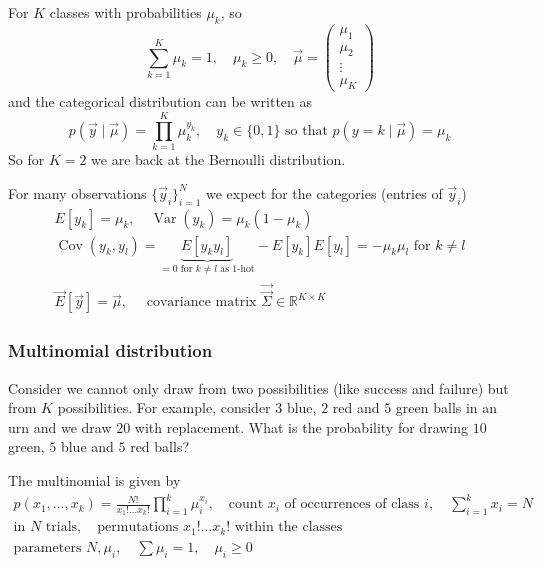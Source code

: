 For $K$ classes with probabilities $\mu_k$, so
\begin{equation}
    \sum_{k=1}^{K} \mu_k = 1, \quad \mu_k \geq 0, \quad \vec{\mu} = \left(\begin{array}{c}
        \mu_1 \\ \mu_2 \\ \vdots \\ \mu_K
    \end{array}\right)
\end{equation}
and the categorical distribution can be written as
\begin{equation}
    p(\vec{y} \mid \vec{\mu}) = \prod_{k=1}^{K} \mu_k^{y_k}, \quad y_k \in \{0,1\} \text{ so that } p(y = k \mid \vec{\mu}) = \mu_k
\end{equation}
So for $K = 2$ we are back at the Bernoulli distribution.

For many observations $\{\vec{y}_i\}_{i=1}^N$ we expect for the categories (entries of $\vec{y}_i$)
\begin{equation}
    \begin{gathered}
    E\left[y_k\right]=\mu_k, \quad \operatorname{Var}\left(y_k\right)=\mu_k\left(1-\mu_k\right) \\
    \operatorname{Cov}\left(y_k, y_l\right)=\underbrace{E\left[y_k y_l\right]}_{=0 \text{ for } k\neq l \text{ as 1-hot}}-E\left[y_k\right] E\left[y_l\right]=-\mu_k \mu_l \text { for } k \neq l \\
    \vec{E}[\vec{y}]=\vec{\mu}, \quad \text { covariance matrix } \vec{\vec{\Sigma}} \in \mathbb{R}^{K \times K}
    \end{gathered}
\end{equation}

\subsubsection{Multinomial distribution}
Consider we cannot only draw from two possibilities (like success and failure) but from $K$ possibilities. For example,
consider $3$ blue, $2$ red and $5$ green balls in an urn and we draw $20$ with replacement. What is the probability
for drawing $10$ green, $5$ blue and $5$ red balls?

The multinomial is given by
\begin{equation}
    \begin{gathered}
        p(x_1,\dots,x_k) = \frac{N!}{x_1! \dots x_k!} \prod_{i=1}^{k} \mu_i^{x_i}, \quad \text{count } x_i \text{ of occurrences of class } i, \quad \sum_{i=1}^{k} x_i = N \\
        \text{in } N \text{ trials}, \quad \text{permutations } x_1! \dots x_k! \text{ within the classes} \\
        \text{parameters } N, \mu_i, \quad \sum \mu_i = 1, \quad \mu_i \geq 0
    \end{gathered}
\end{equation}

